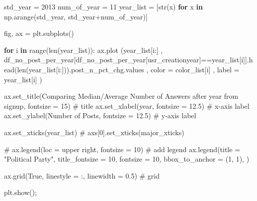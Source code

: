 \documentclass[
  letterpaper,
  DIV=11,
  numbers=noendperiod]{scrartcl}
\newenvironment{Shaded}{\begin{snugshade}}{\end{snugshade}}
\newcommand{\BuiltInTok}[1]{\textcolor[rgb]{0.00,0.23,0.31}{#1}}
\newcommand{\CommentTok}[1]{\textcolor[rgb]{0.37,0.37,0.37}{#1}}
\newcommand{\ControlFlowTok}[1]{\textcolor[rgb]{0.00,0.23,0.31}{\textbf{#1}}}
\newcommand{\DecValTok}[1]{\textcolor[rgb]{0.68,0.00,0.00}{#1}}
\newcommand{\FloatTok}[1]{\textcolor[rgb]{0.68,0.00,0.00}{#1}}
\newcommand{\KeywordTok}[1]{\textcolor[rgb]{0.00,0.23,0.31}{\textbf{#1}}}
\newcommand{\NormalTok}[1]{\textcolor[rgb]{0.00,0.23,0.31}{#1}}
\newcommand{\OperatorTok}[1]{\textcolor[rgb]{0.37,0.37,0.37}{#1}}
\newcommand{\StringTok}[1]{\textcolor[rgb]{0.13,0.47,0.30}{#1}}
\newcommand{\VariableTok}[1]{\textcolor[rgb]{0.07,0.07,0.07}{#1}}
\begin{document}
\begin{Shaded}
\begin{Highlighting}[]
\NormalTok{std\_year }\OperatorTok{=} \DecValTok{2013}
\NormalTok{num\_of\_year }\OperatorTok{=} \DecValTok{11}
\NormalTok{year\_list }\OperatorTok{=}\NormalTok{ [}\BuiltInTok{str}\NormalTok{(x) }\ControlFlowTok{for}\NormalTok{ x }\KeywordTok{in}\NormalTok{ np.arange(std\_year, std\_year}\OperatorTok{+}\NormalTok{num\_of\_year)]}

\NormalTok{fig, ax }\OperatorTok{=}\NormalTok{ plt.subplots()}

\ControlFlowTok{for}\NormalTok{ i }\KeywordTok{in} \BuiltInTok{range}\NormalTok{(}\BuiltInTok{len}\NormalTok{(year\_list)):   }
\NormalTok{        ax.plot (year\_list[i:]}
\NormalTok{        , df\_no\_post\_per\_year[df\_no\_post\_per\_year[}\StringTok{\textquotesingle{}usr\_creationyear\textquotesingle{}}\NormalTok{]}\OperatorTok{==}\NormalTok{year\_list[i]].head(}\BuiltInTok{len}\NormalTok{(year\_list[i:])).post\_n\_pct\_chg.values}
\NormalTok{        ,  color }\OperatorTok{=}\NormalTok{ color\_list[i]}
\NormalTok{        ,  label }\OperatorTok{=}\NormalTok{ year\_list[i]}
\NormalTok{        ) }


\NormalTok{ax.set\_title(}\StringTok{\textquotesingle{}Comparing Median/Average Number of Answers after year from signup\textquotesingle{}}\NormalTok{, fontsize }\OperatorTok{=} \DecValTok{15}\NormalTok{) }\CommentTok{\# title}
\NormalTok{ax.set\_xlabel(}\StringTok{\textquotesingle{}year\textquotesingle{}}\NormalTok{, fontsize }\OperatorTok{=} \FloatTok{12.5}\NormalTok{) }\CommentTok{\# x{-}axis label}
\NormalTok{ax.set\_ylabel(}\StringTok{\textquotesingle{}Number of Posts\textquotesingle{}}\NormalTok{, fontsize }\OperatorTok{=} \FloatTok{12.5}\NormalTok{) }\CommentTok{\# y{-}axis label}

\NormalTok{ax.set\_xticks(year\_list)}
\CommentTok{\# axs[0].set\_xticks(major\_xticks)}

\CommentTok{\# ax.legend(loc = \textquotesingle{}upper right\textquotesingle{}, fontsize = 10) \# add legend}
\NormalTok{ax.legend(title }\OperatorTok{=} \StringTok{"Political Party"}\NormalTok{,}
\NormalTok{          title\_fontsize }\OperatorTok{=} \DecValTok{10}\NormalTok{, fontsize }\OperatorTok{=} \DecValTok{10}\NormalTok{,}
\NormalTok{          bbox\_to\_anchor }\OperatorTok{=}\NormalTok{ (}\DecValTok{1}\NormalTok{, }\DecValTok{1}\NormalTok{), }
\NormalTok{          )}


\NormalTok{ax.grid(}\VariableTok{True}\NormalTok{, linestyle }\OperatorTok{=} \StringTok{\textquotesingle{}:\textquotesingle{}}\NormalTok{, linewidth }\OperatorTok{=} \FloatTok{0.5}\NormalTok{) }\CommentTok{\# grid}

\NormalTok{plt.show()}\OperatorTok{;}
\end{Highlighting}
\end{Shaded}
\end{document}
